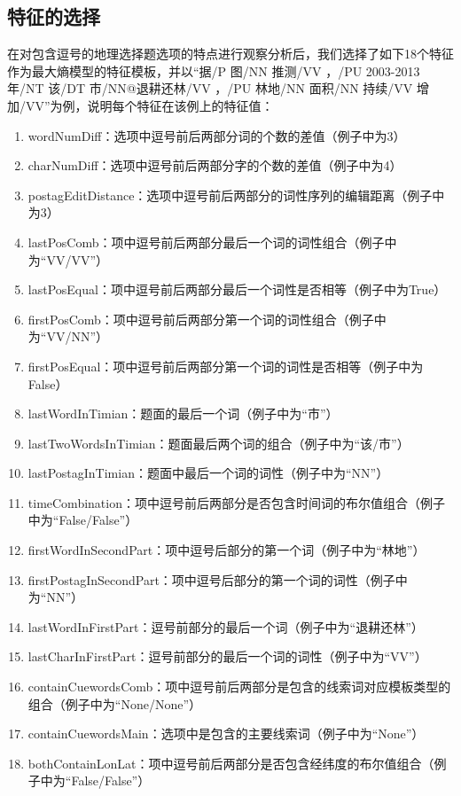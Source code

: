 \documentclass[master, winfont]{njuthesis}
\begin{document}
\subsection{特征的选择}
\label{featuresection}
在对包含逗号的地理选择题选项的特点进行观察分析后，我们选择了如下18个特征作为最大熵模型\cite{MaxEnt1996}\cite{Ratnaparkhi1996A}的特征模板，并以“据/P 图/NN 推测/VV ，/PU 2003-2013年/NT 该/DT 市/NN@退耕还林/VV ，/PU 林地/NN 面积/NN 持续/VV 增加/VV”为例，说明每个特征在该例上的特征值：
\begin{enumerate}
  \item wordNumDiff：选项中逗号前后两部分词的个数的差值（例子中为3）
  \item charNumDiff：选项中逗号前后两部分字的个数的差值（例子中为4）
  \item postagEditDistance：选项中逗号前后两部分的词性序列的编辑距离（例子中为3）
  \item lastPosComb：项中逗号前后两部分最后一个词的词性组合（例子中为“VV/VV”）
  \item lastPosEqual：项中逗号前后两部分最后一个词性是否相等（例子中为True）
  \item firstPosComb：项中逗号前后两部分第一个词的词性组合（例子中为“VV/NN”）
  \item firstPosEqual：项中逗号前后两部分第一个词的词性是否相等（例子中为False）
  \item lastWordInTimian：题面的最后一个词（例子中为“市”）
  \item lastTwoWordsInTimian：题面最后两个词的组合（例子中为“该/市”）
  \item lastPostagInTimian：题面中最后一个词的词性（例子中为“NN”）
  \item timeCombination：项中逗号前后两部分是否包含时间词的布尔值组合（例子中为“False/False”）
  \item firstWordInSecondPart：项中逗号后部分的第一个词（例子中为“林地”）
  \item firstPostagInSecondPart：项中逗号后部分的第一个词的词性（例子中为“NN”）
  \item lastWordInFirstPart：逗号前部分的最后一个词（例子中为“退耕还林”）
  \item lastCharInFirstPart：逗号前部分的最后一个词的词性（例子中为“VV”）
  \item containCuewordsComb：项中逗号前后两部分是包含的线索词对应模板类型的组合（例子中为“None/None”）
  \item containCuewordsMain：选项中是包含的主要线索词（例子中为“None”）
  \item bothContainLonLat：项中逗号前后两部分是否包含经纬度的布尔值组合（例子中为“False/False”）
\end{enumerate}
\end{document}
